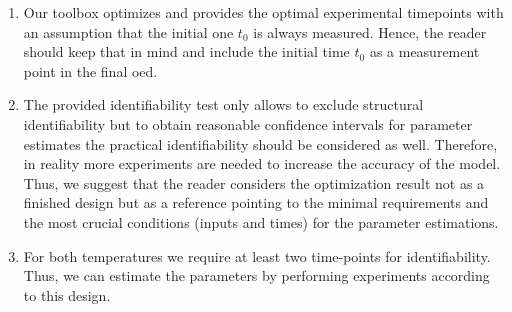 \documentclass[graybox]{svmult}
\begin{document}
\begin{enumerate}
    \item \label{note-timepoints} Our toolbox optimizes and provides the optimal experimental timepoints with an assumption that the initial one $t_0$ is always measured. Hence, the reader should keep that in mind and include the initial time $t_0$ as a measurement point in the final \ac{oed}.
    \item \label{note-structural-identifiability} The provided identifiability test only allows to exclude structural identifiability but to obtain reasonable confidence intervals for parameter estimates the practical identifiability should be considered as well. Therefore, in reality more experiments are needed to increase the accuracy of the model. Thus, we suggest that the reader considers the optimization result not as a finished design but as a reference pointing to the minimal requirements and the most crucial conditions (inputs and times) for the parameter estimations.
    \item \label{note-temperature-identifiability} For both temperatures we require at least two time-points for identifiability. Thus, we can estimate the parameters by performing experiments according to this design.
\end{enumerate}
%
%
%
\end{document}
